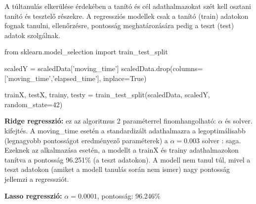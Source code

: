 \begin{programreszlet} A túltanulás elkerülése érdekében a tanító és cél adathalmazokat szét kell osztani tanító és tesztelő részekre. A regressziós modellek csak a tanító (train) adatokon fognak tanulni, ellenőrzésre, pontosság meghatározására pedig a teszt (test) adatok szolgálnak.  \TODO
\begin{python}
from sklearn.model_selection import train_test_split
	
scaledY = scaledData['moving_time']
scaledData.drop(columns=['moving_time','elapsed_time'], inplace=True)

trainX, testX, trainy, testy = train_test_split(scaledData, scaledY, 
						random_state=42)
\end{python}

\end{programreszlet}

\textbf{Ridge regresszió:} ez az algoritmus 2 paraméterrel finomhangolható: $\alpha$ és solver. \TODO kifejtés. A moving\_time esetén a standardizált adathalmazra a legoptimálisabb (legnagyobb pontosságot eredményező paraméterek) a $\alpha = 0.003$ solver : saga. Ezeknek az alkalmazása esetén, a modellt a trainX és trainy adathalmazokon tanítva a pontosság 96.251\% (a teszt adatokon). A modell nem tanul túl, mivel a teszt adatokon (amiket a modell tanulás során nem ismer) nagy pontosság jellemzi a regressziót.

\textbf{Lasso regresszió:} 
$\alpha = 0.0001$, pontosság: 96.246\%

